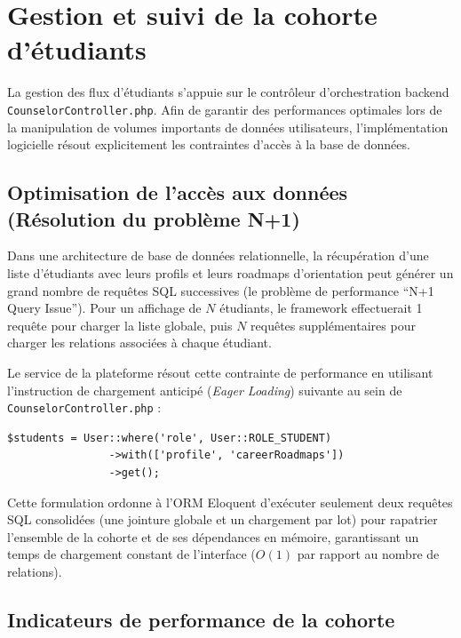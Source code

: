 \section{Gestion et suivi de la cohorte d'étudiants}
\label{sec:gestion_cohorte}

La gestion des flux d'étudiants s'appuie sur le contrôleur d'orchestration backend \texttt{CounselorController.php}. Afin de garantir des performances optimales lors de la manipulation de volumes importants de données utilisateurs, l'implémentation logicielle résout explicitement les contraintes d'accès à la base de données.

\subsection{Optimisation de l'accès aux données (Résolution du problème N+1)}

Dans une architecture de base de données relationnelle, la récupération d'une liste d'étudiants avec leurs profils et leurs roadmaps d'orientation peut générer un grand nombre de requêtes SQL successives (le problème de performance ``N+1 Query Issue''). Pour un affichage de $N$ étudiants, le framework effectuerait 1 requête pour charger la liste globale, puis $N$ requêtes supplémentaires pour charger les relations associées à chaque étudiant.

Le service de la plateforme résout cette contrainte de performance en utilisant l'instruction de chargement anticipé (\textit{Eager Loading}) suivante au sein de \texttt{CounselorController.php} :

\begin{verbatim}
$students = User::where('role', User::ROLE_STUDENT)
                ->with(['profile', 'careerRoadmaps'])
                ->get();
\end{verbatim}

Cette formulation ordonne à l'ORM Eloquent d'exécuter seulement deux requêtes SQL consolidées (une jointure globale et un chargement par lot) pour rapatrier l'ensemble de la cohorte et de ses dépendances en mémoire, garantissant un temps de chargement constant de l'interface ($O(1)$ par rapport au nombre de relations).

\subsection{Indicateurs de performance de la cohorte}

